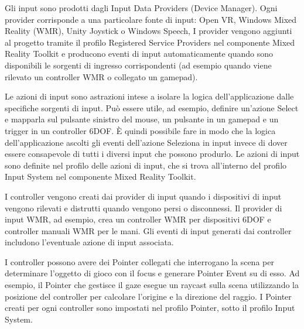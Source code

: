 Gli input sono prodotti dagli Input Data Providers (Device Manager). Ogni provider corrisponde a una particolare fonte di input: Open VR, Windows Mixed Reality (WMR), Unity Joystick o Windows Speech, I provider vengono aggiunti al progetto tramite il profilo Registered Service Providers nel componente Mixed Reality Toolkit e producono eventi di input automaticamente quando sono disponibili le sorgenti di ingresso corrispondenti (ad esempio quando viene rilevato un controller WMR o collegato un gamepad).

Le azioni di input sono astrazioni intese a isolare la logica dell'applicazione dalle specifiche sorgenti di input. Può essere utile, ad esempio, definire un'azione Select e mapparla sul pulsante sinistro del mouse, un pulsante in un gamepad e un trigger in un controller 6DOF. È quindi possibile fare in modo che la logica dell'applicazione ascolti gli eventi dell'azione Seleziona in input invece di dover essere consapevole di tutti i diversi input che possono produrlo. Le azioni di input sono definite nel profilo delle azioni di input, che si trova all'interno del profilo Input System nel componente Mixed Reality Toolkit.

I controller vengono creati dai provider di input quando i dispositivi di input vengono rilevati e distrutti quando vengono persi o disconnessi. Il provider di input WMR, ad esempio, crea un controller WMR per dispositivi 6DOF e controller manuali WMR per le mani. Gli eventi di input generati dai controller includono l'eventuale azione di input associata.

I controller possono avere dei Pointer collegati che interrogano la scena per determinare l'oggetto di gioco con il focus e generare Pointer Event su di esso. Ad esempio, il Pointer che gestisce il gaze esegue un raycast sulla scena utilizzando la posizione del controller per calcolare l'origine e la direzione del raggio. I Pointer creati per ogni controller sono impostati nel profilo Pointer, sotto il profilo Input System.

